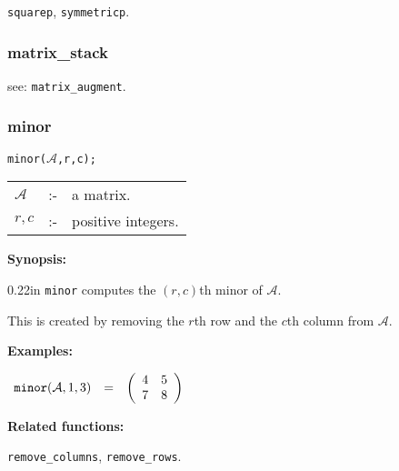 \hspace*{0.175in} {\tt squarep}, {\tt symmetricp}.


\subsubsection{matrix\_stack}
\label{linalg:matrix_stack}
\hspace*{0.175in} see: {\tt matrix\_augment}.


\subsubsection{minor}
\label{linalg:minor}

\hspace*{0.175in} {\tt minor($\mathcal{A}$,r,c);}

\hspace*{0.1in}  
\begin{tabular}{l l l} 
$\mathcal{A}$ &:-& a matrix. \\
$r,c$        &:-& positive integers.
\end{tabular}

{\bf Synopsis:} %

\begin{addtolength}{\leftskip}{0.22in}
                {\tt minor} computes the $(r,c)$th minor of $\mathcal{A}$.
 
                This is created by removing the $r$th row and the $c$th 
                column from $\mathcal{A}$.

\end{addtolength}
                
{\bf Examples:}

\begin{flushleft}  
\hspace*{0.1in}
\begin{math}  
\begin{array}{ccc}
{\tt minor}(\mathcal{A},1,3) & = & 
        \left( \begin{array}{cc} 4 & 5 \\ 7 & 8
 \end{array} \right) 
\end{array}
\end{math}  
\end{flushleft}

{\bf Related functions:}

\hspace*{0.175in} {\tt remove\_columns}, {\tt remove\_rows}.


